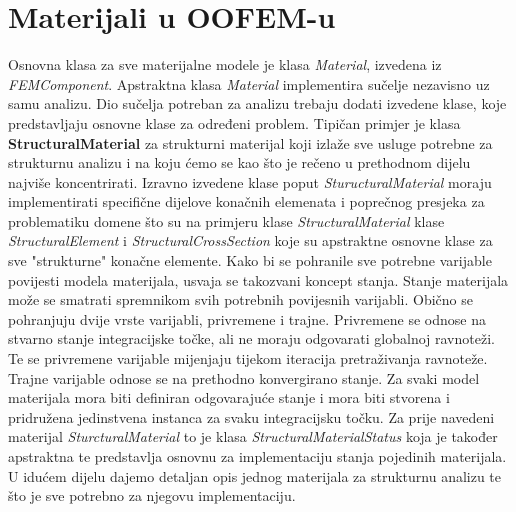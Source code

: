 \documentclass[a4paper,twoside,12pt]{memoir} %
\begin{document}
\section{Materijali u OOFEM-u}
\label{poglavlje:materials_in_oofem}
Osnovna klasa za sve materijalne modele je klasa \textit{Material}, izvedena iz \textit{FEMComponent}. Apstraktna klasa \textit{Material} implementira sučelje nezavisno uz samu analizu. Dio sučelja potreban za analizu trebaju dodati izvedene klase, koje predstavljaju osnovne klase za određeni problem. Tipičan primjer je klasa \textbf{StructuralMaterial} za strukturni materijal koji izlaže sve usluge potrebne za strukturnu analizu i na koju ćemo se kao što je rečeno u prethodnom dijelu najviše koncentrirati. Izravno izvedene klase poput \textit{SturucturalMaterial} moraju implementirati specifične dijelove konačnih elemenata i poprečnog presjeka za problematiku domene što su na primjeru klase \textit{StructuralMaterial} klase \textit{StructuralElement} i \textit{StructuralCrossSection} koje su apstraktne osnovne klase za sve "strukturne" konačne elemente.
Kako bi se pohranile sve potrebne varijable povijesti modela materijala, usvaja se takozvani koncept stanja. Stanje materijala može se smatrati spremnikom svih potrebnih povijesnih varijabli. Obično se pohranjuju dvije vrste varijabli, privremene i trajne. Privremene se odnose na stvarno stanje integracijske točke, ali ne moraju odgovarati globalnoj ravnoteži. Te se privremene varijable mijenjaju tijekom iteracija pretraživanja ravnoteže. Trajne varijable odnose se na prethodno konvergirano stanje. Za svaki model materijala mora biti definiran odgovarajuće stanje i mora biti stvorena i pridružena jedinstvena instanca za svaku integracijsku točku. Za prije navedeni materijal \textit{SturcturalMaterial} to je klasa \textit{StructuralMaterialStatus} koja je također apstraktna te predstavlja osnovnu za implementaciju stanja pojedinih materijala. U idućem dijelu dajemo detaljan opis jednog materijala za strukturnu analizu te što je sve potrebno za njegovu implementaciju.
\end{document}
